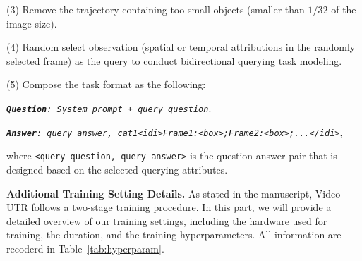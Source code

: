 \noindent (3) Remove the trajectory containing too small objects (smaller than $1/32$ of the image size).

\noindent (4) Random select observation (spatial or temporal attributions in the randomly selected frame) as the query to conduct bidirectional querying task modeling.

\noindent (5) Compose the task format as the following: 

\texttt{\textit{\textbf{Question}: System prompt + query question}}. 

\texttt{\textit{\textbf{Answer}: query answer, cat1<idi>Frame1:<box>;Frame2:<box>;...</idi>}},

where \texttt{<query question, query answer>} is the question-answer pair that is designed based on the selected querying attributes. 

\textbf{Additional Training Setting Details.} As stated in the manuscript, Video-UTR follows a two-stage training procedure. In this part, we will provide a detailed overview of our training settings, including the hardware used for training, the duration, and the training hyperparameters. All information are recoderd in Table~\ref{tab:hyperparam}.

